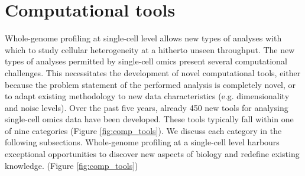 \section{Computational tools}
Whole-genome profiling at single-cell level allows new types of analyses with which to study cellular heterogeneity at a hitherto unseen throughput. 
The new types of analyses permitted by single-cell omics present several computational challenges\cite{stegle_computationalanalyticalchallenges_2015, yuan_challengesemergingdirections_2017, chen_singlecellrnaseqtechnologies_2019}. This necessitates the development of novel computational tools, either because the problem statement of the performed analysis is completely novel, or to adapt existing methodology to new data characteristics (e.g. dimensionality and noise levels). Over the past five years, already 450 new tools for analysing single-cell omics data have been developed\cite{zappia_exploringsinglecellrnaseq_2018}. These tools typically fall within one of nine categories (Figure \ref{fig:comp_tools}). We discuss each category in the following subsections.
Whole-genome profiling at a single-cell level harbours exceptional opportunities to discover new aspects of biology and redefine existing knowledge.
(Figure \ref{fig:comp_tools})


